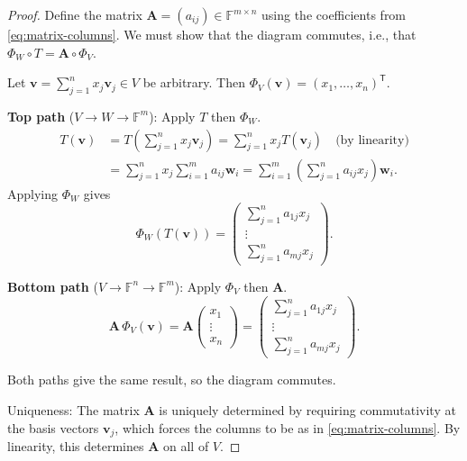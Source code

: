 \begin{proof}
  Define the matrix $\mathbf{A} = (a_{ij}) \in \mathbb{F}^{m \times n}$ using the coefficients from \eqref{eq:matrix-columns}.
  We must show that the diagram commutes, i.e., that $\Phi_W \circ T = \mathbf{A} \circ \Phi_V$.

  Let $\mathbf{v} = \sum_{j=1}^{n} x_j \mathbf{v}_j \in V$ be arbitrary. Then $\Phi_V(\mathbf{v}) = (x_1, \dots, x_n)^{\mathsf{T}}$.

  \textbf{Top path} ($V \to W \to \mathbb{F}^m$): Apply $T$ then $\Phi_W$.
  \begin{align*}
    T(\mathbf{v}) & = T\left(\sum_{j=1}^{n} x_j \mathbf{v}_j\right) = \sum_{j=1}^{n} x_j T(\mathbf{v}_j) \quad \text{(by linearity)}              \\
                  & = \sum_{j=1}^{n} x_j \sum_{i=1}^{m} a_{ij} \mathbf{w}_i = \sum_{i=1}^{m} \left(\sum_{j=1}^{n} a_{ij} x_j\right) \mathbf{w}_i.
  \end{align*}
  Applying $\Phi_W$ gives
  \[
    \Phi_W(T(\mathbf{v})) = \begin{pmatrix} \sum_{j=1}^{n} a_{1j} x_j \\ \vdots \\ \sum_{j=1}^{n} a_{mj} x_j \end{pmatrix}.
  \]

  \textbf{Bottom path} ($V \to \mathbb{F}^n \to \mathbb{F}^m$): Apply $\Phi_V$ then $\mathbf{A}$.
  \[
    \mathbf{A} \, \Phi_V(\mathbf{v}) = \mathbf{A} \begin{pmatrix} x_1 \\ \vdots \\ x_n \end{pmatrix} = \begin{pmatrix} \sum_{j=1}^{n} a_{1j} x_j \\ \vdots \\ \sum_{j=1}^{n} a_{mj} x_j \end{pmatrix}.
  \]

  Both paths give the same result, so the diagram commutes.

  Uniqueness: The matrix $\mathbf{A}$ is uniquely determined by requiring commutativity at the basis vectors $\mathbf{v}_j$,
  which forces the columns to be as in \eqref{eq:matrix-columns}. By linearity, this determines $\mathbf{A}$ on all of $V$.
\end{proof}

